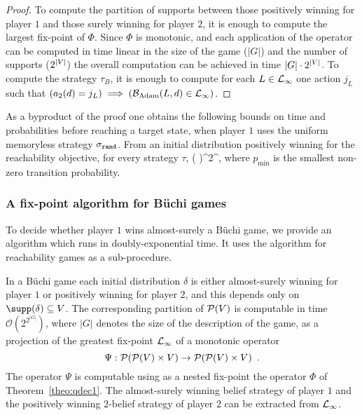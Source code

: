 \begin{proof}
To compute
the partition of supports between those positively winning for player $1$
and those surely winning for player $2$,
it is enough to compute
the largest fix-point of $\Phi$.
Since $\Phi$ is monotonic, and each application of the operator
can be computed in time linear in the size of the game ($|G|$)
and the number of supports ($2^{|V|}$)
the overall computation can be achieved in time $|G| \cdot 2^{|V|}$.
To compute the strategy $\tau_B$, it is enough to compute
for each $L\in\mathcal{L}_\infty$ one action $j_L$ such that
$(a_2(d)=j_L)\implies (\mathcal{B}_{\text{Adam}}(L,d)\in\mathcal{L}_\infty)$.
\end{proof}

As a byproduct of the proof one obtains the following bounds on time
and probabilities before reaching a target state, when player $1$ uses
the uniform memoryless strategy $\sigma_{{\tt rand}}$.  From an initial
distribution positively winning for the reachability objective, for
every strategy $\tau$, \be\label{eq:bounds}
\geq \left(
  \right)^{2^{\lvert\states\lvert}}\enspace,
\ee where $p_{\min}$ is the smallest non-zero transition probability.


\subsubsection{A fix-point algorithm for B{\"u}chi games}

To decide whether player $1$ wins almost-surely a B{\"u}chi game,
we provide an algorithm which runs in doubly-exponential time.
It uses the algorithm for reachability games as a sub-procedure.


\begin{theorem}
  \label{theo:qdec2} In a B{\"u}chi game each initial distribution
  $\delta$ is either almost-surely winning for player $1$ or
  positively winning for player $2$, and this depends only on
  $\supp(\delta)\subseteq \states$.
The corresponding partition of $\mathcal{P}(V)$ is computable in
time $\mathcal{O}\left(2^{2^{|G|}}\right)$, where $|G|$ denotes the size of the description of the game,
as a projection of the greatest
fix-point $\mathcal{L}_\infty$
of a monotonic operator
\[\Psi:
\mathcal{P}(\mathcal{P}(V)\times V)
\to
\mathcal{P}(\mathcal{P}(V)\times V)
\enspace.
\]
The operator $\Psi$ is computable using as a nested fix-point the operator $\Phi$ of Theorem~\ref{theo:qdec1}.
 The almost-surely winning belief strategy of player $1$ and the positively winning $2$-belief strategy of player $2$  can be extracted 
from $\mathcal{L}_\infty$.
\end{theorem}

